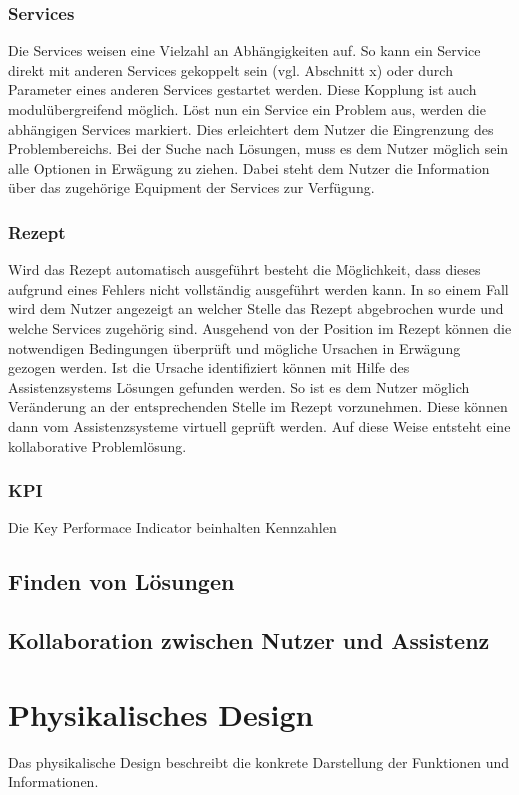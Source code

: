 \subsubsection*{Services}
Die Services weisen eine Vielzahl an Abhängigkeiten auf. So kann ein Service direkt mit anderen Services gekoppelt sein (vgl. Abschnitt x) oder durch Parameter eines anderen Services gestartet werden. Diese Kopplung ist auch modulübergreifend möglich. Löst nun ein Service ein Problem aus, werden die abhängigen Services markiert. Dies erleichtert dem Nutzer die Eingrenzung des Problembereichs. Bei der Suche nach Lösungen, muss es dem Nutzer möglich sein alle Optionen in Erwägung zu ziehen. Dabei steht dem Nutzer die Information über das zugehörige Equipment der Services zur Verfügung.

\subsubsection*{Rezept}
Wird das Rezept automatisch ausgeführt besteht die Möglichkeit, dass dieses aufgrund eines Fehlers nicht vollständig ausgeführt werden kann. In so einem Fall wird dem Nutzer angezeigt an welcher Stelle das Rezept abgebrochen wurde und welche Services zugehörig sind. Ausgehend von der Position im Rezept können die notwendigen Bedingungen überprüft und mögliche Ursachen in Erwägung gezogen werden. Ist die Ursache identifiziert können mit Hilfe des Assistenzsystems Lösungen gefunden werden. So ist es dem Nutzer möglich Veränderung an der entsprechenden Stelle im Rezept vorzunehmen. Diese können dann vom Assistenzsysteme virtuell geprüft werden. Auf diese Weise entsteht eine kollaborative Problemlösung.

\subsubsection*{KPI}
Die Key Performace Indicator beinhalten Kennzahlen 

\subsection{Finden von Lösungen}

\subsection{Kollaboration zwischen Nutzer und Assistenz}


\section{Physikalisches Design}
Das physikalische Design beschreibt die konkrete Darstellung der Funktionen und Informationen.

